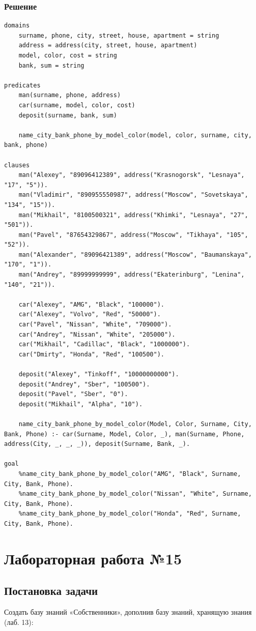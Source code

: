 \documentclass[12pt]{report}
\begin{document}
\subsection*{Решение}
\begin{lstlisting}
domains
	surname, phone, city, street, house, apartment = string
	address = address(city, street, house, apartment)
	model, color, cost = string
	bank, sum = string

predicates
	man(surname, phone, address)
	car(surname, model, color, cost)
	deposit(surname, bank, sum)

	name_city_bank_phone_by_model_color(model, color, surname, city, bank, phone)

clauses
	man("Alexey", "89096412389", address("Krasnogorsk", "Lesnaya", "17", "5")).
	man("Vladimir", "890955550987", address("Moscow", "Sovetskaya", "134", "15")).
	man("Mikhail", "8100500321", address("Khimki", "Lesnaya", "27", "501")).
	man("Pavel", "87654329867", address("Moscow", "Tikhaya", "105", "52")).
	man("Alexander", "89096421389", address("Moscow", "Baumanskaya", "170", "1")).
	man("Andrey", "89999999999", address("Ekaterinburg", "Lenina", "140", "21")).

	car("Alexey", "AMG", "Black", "100000").
	car("Alexey", "Volvo", "Red", "50000").
	car("Pavel", "Nissan", "White", "709000").
	car("Andrey", "Nissan", "White", "205000").
	car("Mikhail", "Cadillac", "Black", "1000000").
	car("Dmirty", "Honda", "Red", "100500").

	deposit("Alexey", "Tinkoff", "10000000000").
	deposit("Andrey", "Sber", "100500").
	deposit("Pavel", "Sber", "0").
	deposit("Mikhail", "Alpha", "10").

	name_city_bank_phone_by_model_color(Model, Color, Surname, City, Bank, Phone) :- car(Surname, Model, Color, _), man(Surname, Phone, address(City, _, _, _)), deposit(Surname, Bank, _).

goal
	%name_city_bank_phone_by_model_color("AMG", "Black", Surname, City, Bank, Phone).
	%name_city_bank_phone_by_model_color("Nissan", "White", Surname, City, Bank, Phone).
	%name_city_bank_phone_by_model_color("Honda", "Red", Surname, City, Bank, Phone).
\end{lstlisting}

\chapter*{Лабораторная работа №15}
\section*{Постановка задачи}
Создать базу знаний «Собственники», дополнив базу знаний, хранящую знания (лаб. 13):
\end{document}
